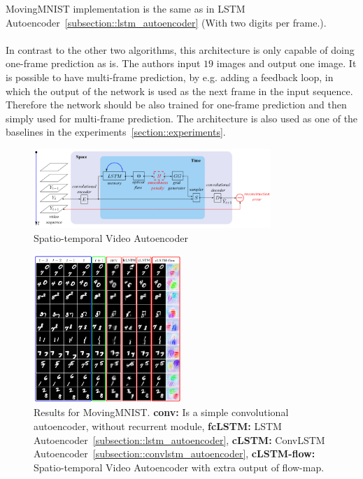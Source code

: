   MovingMNIST implementation is the same as in LSTM Autoencoder~\ref{subsection::lstm_autoencoder} (With two digits per frame.).
  \\\\
  In contrast to the other two algorithms, this architecture is only capable of doing one-frame prediction as is. The authors input $19$ images and output one 
  image. It is possible to have multi-frame prediction, by e.g. adding a feedback loop, in which the output of the network is used as the next frame in the input 
  sequence. Therefore the network should be also trained for one-frame prediction and then simply used for multi-frame prediction. The architecture is also used
  as one of the baselines in the experiments~\ref{section::experiments}.
  \begin{figure}[H]
   \includegraphics[width=0.8\textwidth]{../Images/patraucean.png}
   \centering
   \caption{Spatio-temporal Video Autoencoder \cite{Patraucean2015}}
   \label{fig:spatiotemp_architecture}
  \end{figure}
  \begin{figure}[H]
   \includegraphics[width=0.5\textwidth]{../Images/patraucean_results_mnist.png}
   \centering
   \caption{Results for MovingMNIST. \textbf{conv:} Is a simple convolutional autoencoder, without recurrent module, \textbf{fcLSTM:} LSTM Autoencoder~\ref{subsection::lstm_autoencoder},
   \textbf{cLSTM:} ConvLSTM Autoencoder~\ref{subsection::convlstm_autoencoder}, \textbf{cLSTM-flow:} Spatio-temporal Video Autoencoder with extra output of flow-map. \cite{Patraucean2015}}
   \label{fig:spatiotemp_results}
  \end{figure}
 
